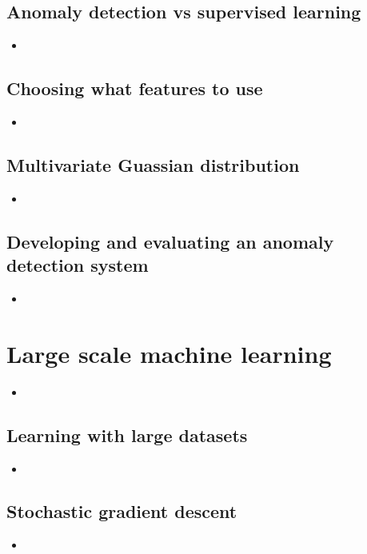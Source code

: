 \documentclass[13pt]{book}
\begin{document}
\section{Anomaly detection vs supervised learning}
\begin{itemize}
  \item
\end{itemize}

\section{Choosing what features to use}
\begin{itemize}
  \item
\end{itemize}

\section{Multivariate Guassian distribution}
\begin{itemize}
  \item
\end{itemize}

\section{Developing and evaluating an anomaly detection system}
\begin{itemize}
  \item
\end{itemize}

\chapter{Large scale machine learning}
\begin{itemize}
  \item
\end{itemize}

\section{Learning with large datasets}
\begin{itemize}
  \item
\end{itemize}

\section{Stochastic gradient descent}
\begin{itemize}
  \item
\end{itemize}
\end{document}
